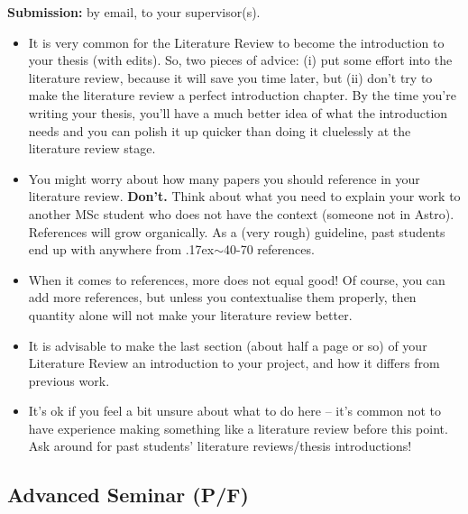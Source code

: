 \documentclass[11pt, oneside, a4paper]{article}
\newcommand{\tipscolor}{ForestGreen}
\newcommand{\mytilde}{\raise.17ex\hbox{$\scriptstyle\mathtt{\sim}$}}
\begin{document}
\noindent
\textbf{Submission:} by email, to your supervisor(s). 

\begin{tcolorbox}[colback=\tipscolor!5!white,colframe=\tipscolor!50!white,title={Tips \& Tricks}]
    \begin{itemize}
        \item It is very common for the Literature Review to become the introduction to your thesis (with edits). So, two pieces of advice: (i) put some effort into the literature review, because it will save you time later, but (ii) don't try to make the literature review a perfect introduction chapter. By the time you're writing your thesis, you'll have a much better idea of what the introduction needs and you can polish it up quicker than doing it cluelessly at the literature review stage.
        \item You might worry about how many papers you should reference in your literature review. \textbf{Don't.} Think about what you need to explain your work to another MSc student who does not have the context (someone not in Astro). References will grow organically. As a (very rough) guideline, past students end up with anywhere from \mytilde40-70 references. 
        \item When it comes to references, more does not equal good! Of course, you can add more references, but unless you contextualise them properly, then quantity alone will not make your literature review better.
        \item It is advisable to make the last section (about half a page or so) of your Literature Review an introduction to your project, and how it differs from previous work.
    \end{itemize}
\end{tcolorbox}

\begin{tcolorbox}[colback=\tipscolor!5!white,colframe=\tipscolor!50!white,title={Tips \& Tricks (cont.)}]
    \begin{itemize}
        
        \item It's ok if you feel a bit unsure about what to do here -- it's common not to have experience making something like a literature review before this point. Ask around for past students' literature reviews/thesis introductions! 
    \end{itemize}
\end{tcolorbox}

\subsection*{Advanced Seminar (P/F)}\label{AdvSeminar}
\end{document}
